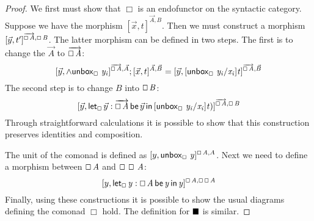 \begin{proof}
  We first must show that $\Box$ is an endofunctor on the syntactic
  category.  Suppose we have the morphism
  $[\vec{x},t]^{\vec{A},B}$.  Then we must construct a morphism
  $[\vec{y},t']^{\overrightarrow{\oblong \, \mathit{A}},\oblong \, \mathit{B}}$.  The latter morphism can be defined in two steps.
  The first is to change the $\vec{A}$ to $\overrightarrow{\oblong \, \mathit{A}}$:
  \[
    [ \vec{y},\wedge \mathsf{unbox}_\oblong\, \, \mathit{y_{\mathit{i}}} ]^{\overrightarrow{\oblong \, \mathit{A}},\vec{A}};[\vec{x},t]^{\vec{A},\vec{B}}
    = [\vec{y}, [ \mathsf{unbox}_\oblong\, \, \mathit{y_{\mathit{i}}}/\mathit{x_{\mathit{i}}} ] \mathit{t} ]^{\overrightarrow{\oblong \, \mathit{A}},\vec{B}}
    \]
    The second step is to change $B$ into $\oblong \, \mathit{B}$:
    \[
      [\vec{y},\mathsf{let}_\oblong\,\vec{y}:\overrightarrow{\oblong \, \mathit{A}}\,\mathsf{be}\,\vec{y}\,\mathsf{in}\,[ \mathsf{unbox}_\oblong\, \, \mathit{y_{\mathit{i}}}/\mathit{x_{\mathit{i}}} ]\mathit{t})]^{\overrightarrow{\oblong \, \mathit{A}},\oblong \, \mathit{B}}
      \]
  Through straightforward calculations it is possible to show that
  this construction preserves identities and composition.

  The unit of the comonad is defined as $[ y,\mathsf{unbox}_\oblong\, \, \mathit{y} ]^{\oblong \, \mathit{A},A}$.  Next we need to define a morphism between $\oblong \, \mathit{A}$ and $\oblong \, \oblong \, \mathit{A}$:
  \[
  [y, \mathsf{let}_\oblong\, \mathit{y}  :  \oblong \, \mathit{A} \,\mathsf{be}\, \mathit{y} \,\mathsf{in}\, \mathit{y}  ]^{\oblong \, \mathit{A},\oblong \, \oblong \, \mathit{A}}
  \]
  Finally, using these constructions it is possible to show the usual
  diagrams defining the comonad $\Box$ hold.  The definition for
  $\blacksquare$ is similar.
\end{proof}
